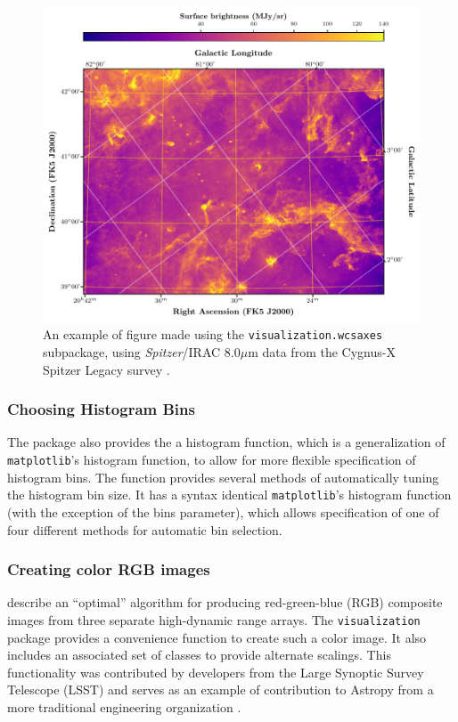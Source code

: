 \documentclass[modern]{aastex61}
\newcommand{\package}[1]{\texttt{#1}\xspace}
\begin{document}
\begin{figure}
\includegraphics[width=\textwidth]{cygnus_x_spitzer.pdf}
\caption{%
An example of figure made using the \package{visualization.wcsaxes} subpackage, using \textit{Spitzer}/IRAC 8.0$\mu$m data from the Cygnus-X Spitzer Legacy survey \citep{cygnusx}.
\label{fig:wcsaxes}
}
\end{figure}

\subsubsection{Choosing Histogram Bins}

The package also provides the a histogram function, which is a generalization of \package{matplotlib}’s histogram function, to allow for more flexible specification of histogram bins.  The function provides several methods of automatically tuning the histogram bin size. It has a syntax identical \package{matplotlib}’s histogram function (with the exception of the bins parameter), which allows specification of one of four different methods for automatic bin selection.

\subsubsection{Creating color RGB images}

\cite{Lupton2004} describe an “optimal” algorithm for producing red-green-blue (RGB) composite images from three separate high-dynamic range arrays. The \package{visualization} package provides a convenience function to create such a color image.  It also includes an associated set of classes to provide alternate scalings.
This functionality was contributed by developers from the Large Synoptic Survey Telescope (LSST) and serves as an example of contribution to Astropy from a more traditional engineering organization \citep{lsst_astropy}.
\end{document}
